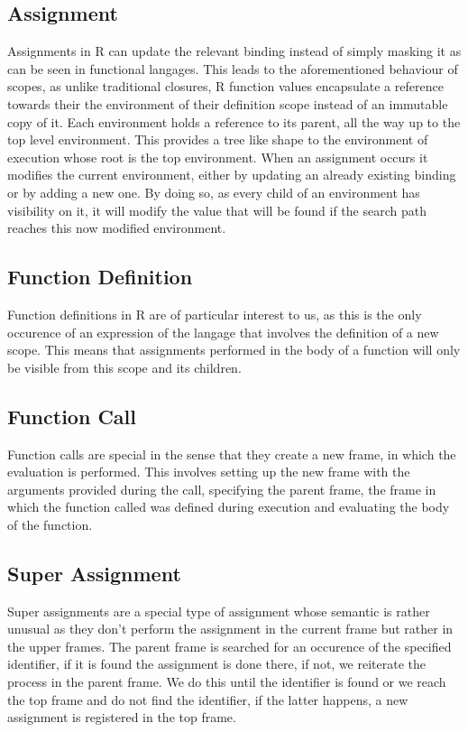 \subsection{Assignment}

Assignments in R can update the relevant binding instead of simply masking it as can be seen in functional langages. This leads to the aforementioned behaviour of scopes, as unlike traditional closures, R function values encapsulate a reference towards their the environment of their definition scope instead of an immutable copy of it. Each environment holds a reference to its parent, all the way up to the top level environment. This provides a tree like shape to the environment of execution whose root is the top environment. When an assignment occurs it modifies the current environment, either by updating an already existing binding or by adding a new one. By doing so, as every child of an environment has visibility on it, it will modify the value that will be found if the search path reaches this now modified environment.

\subsection{Function Definition}

Function definitions in R are of particular interest to us, as this is the only occurence of an expression of the langage that involves the definition of a new scope. This means that assignments performed in the body of a function will only be visible from this scope and its children. 

\subsection{Function Call}

Function calls are special in the sense that they create a new frame, in which the evaluation is performed. This involves setting up the new frame with the arguments provided during the call, specifying the parent frame, the frame in which the function called was defined during execution and evaluating the body of the function.

\subsection{Super Assignment}

Super assignments are a special type of assignment whose semantic is rather unusual as they don't perform the assignment in the current frame but rather in the upper frames. The parent frame is searched for an occurence of the specified identifier, if it is found the assignment is done there, if not, we reiterate the process in the parent frame. We do this until the identifier is found or we reach the top frame and do not find the identifier, if the latter happens, a new assignment is registered in the top frame.

